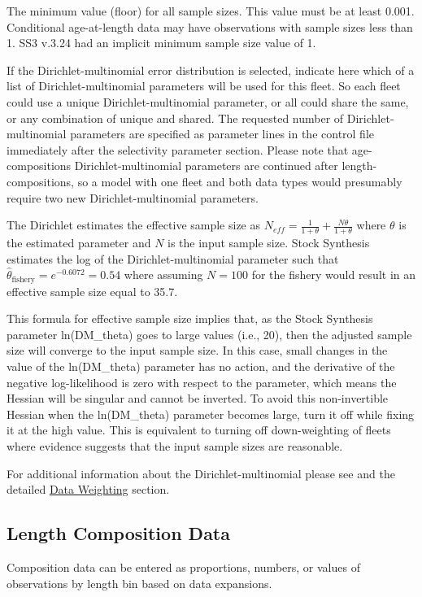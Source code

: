 The minimum value (floor) for all sample sizes. This value must be at least 0.001. Conditional age-at-length data may have observations with sample sizes less than 1. SS3 v.3.24 had an implicit minimum sample size value of 1.

If the Dirichlet-multinomial error distribution is selected, indicate here which of a list of Dirichlet-multinomial parameters will be used for this fleet.  So each fleet could use a unique Dirichlet-multinomial parameter, or all could share the same, or any combination of unique and shared.  The requested number of Dirichlet-multinomial parameters are specified as parameter lines in the control file immediately after the selectivity parameter section. Please note that age-compositions Dirichlet-multinomial parameters are continued after length-compositions, so a model with one fleet and both data types would presumably require two new Dirichlet-multinomial parameters.  	
	
The Dirichlet estimates the effective sample size as $N_{eff}=\frac{1}{1+\theta}+\frac{N\theta}{1+\theta}$ where $\theta$ is the estimated parameter and $N$ is the input sample size.  Stock Synthesis estimates the log of the Dirichlet-multinomial parameter such that $\hat{\theta}_{\text{fishery}} = e^{-0.6072} = 0.54$ where assuming $N=100$ for the fishery would result in an effective sample size equal to 35.7.
	
This formula for effective sample size implies that, as the Stock Synthesis parameter ln(DM\_theta) goes to large values (i.e., 20), then the adjusted sample size will converge to the input sample size.  In this case, small changes in the value of the ln(DM\_theta) parameter has no action, and the derivative of the negative log-likelihood is zero with respect to the parameter, which means the Hessian will be singular and cannot be inverted. To avoid this non-invertible Hessian when the ln(DM\_theta) parameter becomes large, turn it off while fixing it at the high value. This is equivalent to turning off down-weighting of fleets where evidence suggests that the input sample sizes are reasonable.
	
For additional information about the Dirichlet-multinomial please see \citet{thorson-model-based-2017} and the detailed \hyperlink{DataWeight}{Data Weighting} section.

\hypertarget{CompTiming}{}
\subsection{Length Composition Data}
Composition data can be entered as proportions, numbers, or values of observations by length bin based on data expansions.  

